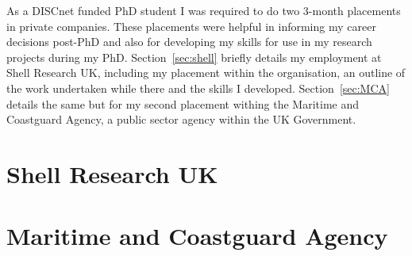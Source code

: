 As a DISCnet funded PhD student I was required to do two 3-month placements in private companies. These placements were helpful in informing my career decisions post-PhD and also for developing my skills for use in my research projects during my PhD. Section~\ref{sec:shell} briefly details my employment at Shell Research UK, including my placement within the organisation, an outline of the work undertaken while there and the skills I developed. Section~\ref{sec:MCA} details the same but for my second placement withing the Maritime and Coastguard Agency, a public sector agency within the UK Government.

\section{\label{sec:shell}Shell Research UK}

\section{\label{sec:MCA}Maritime and Coastguard Agency}
